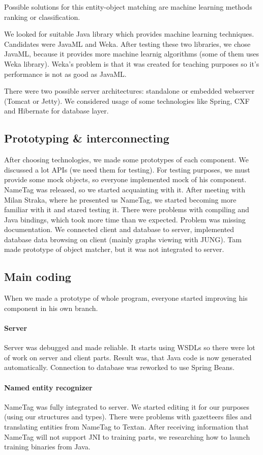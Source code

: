 Possible solutions for this entity-object matching are machine learning  methods
ranking or classification.

We looked for suitable Java library which provides machine learning techniques.
Candidates were JavaML and Weka. After testing these two libraries, we chose
JavaML, because it provides more machine learnig algorithms (some of them uses
Weka library). Weka's problem is that it was created for teaching purposes so
it's performance is not as good as JavaML.

There were two possible server architectures: standalone or embedded webserver
(Tomcat or Jetty). We considered usage of some technologies like Spring, CXF and
Hibernate for database layer.

\subsection{Prototyping \& interconnecting}
After choosing technologies, we made some prototypes of each component. We
discussed a lot APIs (we need them for testing). For testing purposes, we must
provide some mock objects, so everyone implemented mock of his component.
NameTag was released, so we started acquainting with it. After meeting with Milan Straka, where he presented us NameTag, we started becoming more familiar with it and stared testing it.
There were problems with compiling and Java bindings, which took more time than we expected. Problem was missing documentation.
We connected client and database to server, implemented database data browsing on client (mainly graphs viewing with JUNG).
Tam made prototype of object matcher, but it was not integrated to server.

\subsection{Main coding}
When we made a prototype of whole program, everyone started improving his component in his own branch.
\paragraph{Server} Server was debugged and made reliable. It starts using WSDLs so there were lot of work on server and client parts. Result was, that Java code is now generated automatically. Connection to database was reworked to use Spring Beans.
\paragraph{Named entity recognizer} NameTag was fully integrated to server. We started editing it for our purposes (using our structures and types). There were problems with gazetteers files and translating entities from NameTag to Textan.
After receiving information that NameTag will not support JNI to training parts, we researching how to launch training binaries from Java.
